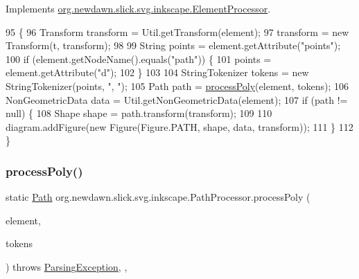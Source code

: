Implements \mbox{\hyperlink{interfaceorg_1_1newdawn_1_1slick_1_1svg_1_1inkscape_1_1_element_processor_acd170a9e1119481edae885780db59a2e}{org.\+newdawn.\+slick.\+svg.\+inkscape.\+Element\+Processor}}.


\begin{DoxyCode}
95                                                                                                            
         \{
96         Transform transform = Util.getTransform(element);
97         transform = \textcolor{keyword}{new} Transform(t, transform);
98         
99         String points = element.getAttribute(\textcolor{stringliteral}{"points"});
100         \textcolor{keywordflow}{if} (element.getNodeName().equals(\textcolor{stringliteral}{"path"})) \{
101             points = element.getAttribute(\textcolor{stringliteral}{"d"});
102         \}
103         
104         StringTokenizer tokens = \textcolor{keyword}{new} StringTokenizer(points, \textcolor{stringliteral}{", "});
105         Path path = \mbox{\hyperlink{classorg_1_1newdawn_1_1slick_1_1svg_1_1inkscape_1_1_path_processor_aead19050eb87e2b4e27228ddf54b7e8e}{processPoly}}(element, tokens);
106         NonGeometricData data = Util.getNonGeometricData(element);
107         \textcolor{keywordflow}{if} (path != null) \{
108             Shape shape = path.transform(transform);
109             
110             diagram.addFigure(\textcolor{keyword}{new} Figure(Figure.PATH, shape, data, transform));
111         \}
112     \}
\end{DoxyCode}
\mbox{\label{classorg_1_1newdawn_1_1slick_1_1svg_1_1inkscape_1_1_path_processor_aead19050eb87e2b4e27228ddf54b7e8e}} 
\subsubsection{\texorpdfstring{process\+Poly()}{processPoly()}}
{\footnotesize\ttfamily static \mbox{\hyperlink{classorg_1_1newdawn_1_1slick_1_1geom_1_1_path}{Path}} org.\+newdawn.\+slick.\+svg.\+inkscape.\+Path\+Processor.\+process\+Poly (\begin{DoxyParamCaption}\item[{Element}]{element,  }\item[{String\+Tokenizer}]{tokens }\end{DoxyParamCaption}) throws \mbox{\hyperlink{classorg_1_1newdawn_1_1slick_1_1svg_1_1_parsing_exception}{Parsing\+Exception}}\hspace{0.3cm}{\ttfamily [inline]}, {\ttfamily [static]}, {\ttfamily [private]}}

